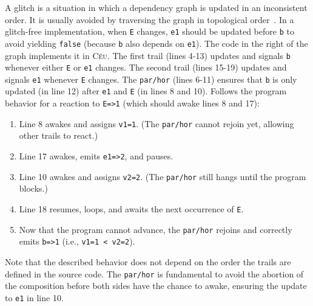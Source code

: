 \documentclass{acm_proc_article-sp}
\newcommand{\CEU}{\textsc{C\'{e}u}\xspace}
\newcommand{\code}[1] {{\small{\texttt{#1}}}}
\newcommand{\1}{\;}
\newcommand{\2}{\;\;}
\newcommand{\3}{\;\;\;}
\newcommand{\5}{\;\;\;\;\;}
\begin{document}
A glitch is a situation in which a dependency graph is updated in an 
inconsistent order.
It is usually avoided by traversing the graph in topological 
order~\cite{frtime.embedding,frp.survey}.
%
In a glitch-free implementation, when \code{E} changes, \code{e1} should be 
updated before \code{b} to avoid yielding \code{false} (because \code{b} also 
depends on \code{e1}).
%
The code in the right of the graph implements it in \CEU.
The first trail (lines 4-13) updates and signals \code{b} whenever either 
\code{E} or \code{e1} changes.
The second trail (lines 15-19) updates and signals \code{e1} whenever \code{E} 
changes.
%
The \code{par/hor} (lines 6-11) ensures that \code{b} is only updated (in line 
12) after \code{e1} and \code{E} (in lines 8 and 10).
%
Follows the program behavior for a reaction to \code{E=>1} (which should awake 
lines 8 and 17):

{\small
\begin{enumerate}
\setlength{\itemsep}{0pt}
\item Line 8 awakes and assigns \code{v1=1}.
      (The \code{par/hor} cannot rejoin yet, allowing other trails to react.)
\item Line 17 awakes, emits \code{e1=>2}, and pauses.
\item Line 10 awakes and assigns \code{v2=2}.
      (The \code{par/hor} still hangs until the program blocks.)
\item Line 18 resumes, loops, and awaits the next occurrence of \code{E}.
\item Now that the program cannot advance, the \code{par/hor} rejoins and 
        correctly emits \code{b=>1} (i.e., \code{v1=1 < v2=2}).
\end{enumerate}
}

Note that the described behavior does not depend on the order the trails are 
defined in the source code.
The \code{par/hor} is fundamental to avoid the abortion of the composition 
before both sides have the chance to awake, ensuring the update to \code{e1} in 
line 10.
\end{document}
